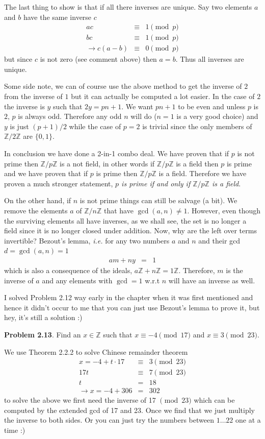 \documentclass[aps,preprint,preprintnumbers,nofootinbib,showpacs,prd]{revtex4-1}
\newcommand{\ie}{{\it i.e.} }
\newcommand{\nbea}{\begin{eqnarray*}}
\newcommand{\neea}{\end{eqnarray*}}
\begin{document}
The last thing to show is that if all there inverses are unique. Say two elements $a$ and $b$ have the same inverse $c$
%
\nbea
ac & \equiv & 1 \pmod{p} \\
bc & \equiv & 1 \pmod{p} \\
\to c(a-b) & \equiv & 0 \pmod{p}
\neea
%
but since $c$ is not zero (see comment above) then $a=b$. Thus all inverses are unique.

Some side note, we can of course use the above method to get the inverse of $2$ from the inverse of $1$ but it can actually be computed a lot easier. In the case of $2$ the inverse is $y$ such that $2y = pn +  1$. We want $pn + 1$ to be even and unless $p$ is $2$, $p$ is always odd. Therefore any odd $n$ will do ($n=1$ is a very good choice) and $y$ is just $(p+1)/2$ while the case of $p=2$ is trivial since the only members of $\mathbb{Z}/2\mathbb{Z}$ are $\{0,1\}$.

In conclusion we have done a 2-in-1 combo deal. We have proven that if $p$ is not prime then $\mathbb{Z}/p\mathbb{Z}$ is a not field, in other words if $\mathbb{Z}/p\mathbb{Z}$ is a field then $p$ is prime and we have proven that if $p$ is prime then $\mathbb{Z}/p\mathbb{Z}$ is a field. Therefore we have proven a much stronger statement, {\it $p$ is prime if and only if $\mathbb{Z}/p\mathbb{Z}$ is a field}.

On the other hand, if $n$ is not prime things can still be salvage (a bit). We remove the elements $a$ of $\mathbb{Z}/n\mathbb{Z}$ that have $\gcd(a,n) \neq 1$. However, even though the surviving elements all have inverses, as we shall see, the set is no longer a field since it is no longer closed under addition. Now, why are the left over terms invertible? Bezout's lemma, \ie for any two numbers $a$ and $n$ and their gcd $d = \gcd(a,n) = 1$
%
\nbea
am + ny & = & 1
\neea
%
which is also a consequence of the ideals, $a\mathbb{Z} + n\mathbb{Z} = 1\mathbb{Z}$. Therefore, $m$ is the inverse of $a$ and any elements with $\gcd=1$ w.r.t $n$ will have an inverse as well.

I solved Problem 2.12 way early in the chapter when it was first mentioned and hence it didn't occur to me that you can just use Bezout's lemma to prove it, but hey, it's still a solution :)

{\bf Problem 2.13}. Find an $x \in \mathbb{Z}$ such that $x \equiv −4 \pmod{17}$ and $x \equiv 3 \pmod{23}$.

We use Theorem 2.2.2 to solve Chinese remainder theorem
%
\nbea
x = -4 + t\cdot 17 & \equiv & 3 \pmod{23} \\
17 t & \equiv & 7 \pmod{23} \\
t & = & 18 \\
\to x = -4 + 306 & = & 302
\neea
%
to solve the above we first need the inverse of 17 $\pmod{23}$ which can be computed by the extended gcd of 17 and 23. Once we find that we just multiply the inverse to both sides. Or you can just try the numbers between $1 \dots 22$ one at a time :)
\end{document}
